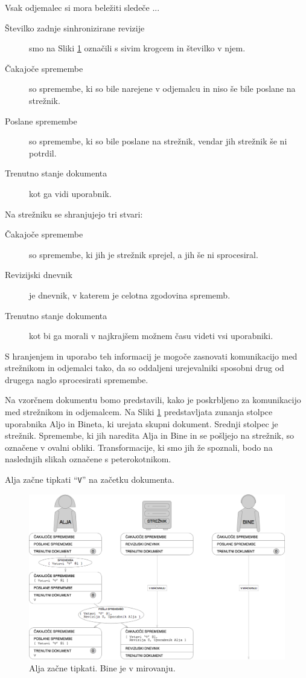 \documentclass[a4paper, 12pt, twoside]{book}
\begin{document}
Vsak odjemalec si mora beležiti sledeče ...
\begin{description}
	\item[Številko zadnje sinhronizirane revizije] smo na Sliki \ref{pc1} označili s sivim krogcem in številko v njem.
	\item[Čakajoče spremembe] so spremembe, ki so bile narejene v odjemalcu in niso še bile poslane na strežnik.
	\item[Poslane spremembe] so spremembe, ki so bile poslane na strežnik, vendar jih strežnik še ni potrdil.
	\item[Trenutno stanje dokumenta] kot ga vidi uporabnik.
\end{description}

Na strežniku se shranjujejo tri stvari:
\begin{description}
	\item[Čakajoče spremembe] so spremembe, ki jih je strežnik sprejel, a jih še ni sprocesiral.
	\item[Revizijski dnevnik] je dnevnik, v katerem je celotna zgodovina sprememb.
	\item[Trenutno stanje dokumenta] kot bi ga morali v najkrajšem možnem času videti vsi uporabniki.
\end{description}

S hranjenjem in uporabo teh informacij je mogoče zasnovati komunikacijo med strežnikom in odjemalci tako, da so oddaljeni urejevalniki sposobni drug od drugega naglo sprocesirati spremembe.

Na vzorčnem dokumentu bomo predstavili, kako je poskrbljeno za komunikacijo med strežnikom in odjemalcem. Na Sliki \ref{pc1} predstavljata zunanja stolpce uporabnika Aljo in Bineta, ki urejata skupni dokument. Srednji stolpec je strežnik. Spremembe, ki jih naredita Alja in Bine in se pošljejo na strežnik, so označene v ovalni obliki. Transformacije, ki smo jih že spoznali, bodo na naslednjih slikah označene s peterokotnikom.

Alja začne tipkati “{\tt V}” na začetku dokumenta.

\begin{figure}[placement h]
\begin{center}
\includegraphics[width=14cm]{pc1.png}
\end{center}
\caption{Alja začne tipkati. Bine je v mirovanju.}
\label{pc1}
\end{figure}
\end{document}
